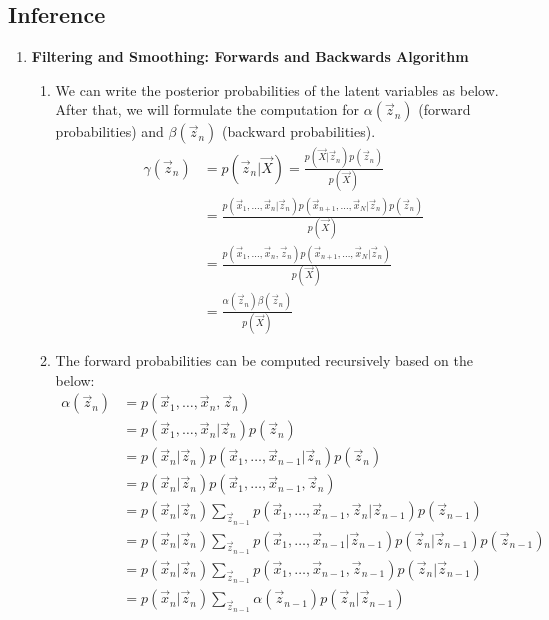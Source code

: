 \documentclass[12pt,twoside]{article}
\begin{document}
\subsection{Inference}
\begin{enumerate}
\item \textbf{Filtering and Smoothing: Forwards and Backwards Algorithm}

	\begin{enumerate}

	\item We can write the posterior probabilities of the latent variables as below. After that, we will formulate the computation for $\alpha(\vec{z}_n)$ (forward probabilities) and $		\beta(\vec{z}_n)$ (backward probabilities).
		\begin{align*}
			\gamma(\vec{z}_n) & = p(\vec{z}_n\vert \vec{X}) = \frac{p(\vec{X}\vert \vec{z}_n)p(\vec{z}_n)}{p(\vec{X})}\\
			& = \frac{p(\vec{x}_1,\ldots, \vec{x}_n \vert \vec{z}_n)p(\vec{x}_{n+1},\ldots,\vec{x}_N\vert \vec{z}_n)p(\vec{z}_n)}{p(\vec{X})}\\
			& = \frac{p(\vec{x}_1,\ldots, \vec{x}_n, \vec{z}_n)p(\vec{x}_{n+1},\ldots,\vec{x}_N\vert \vec{z}_n)}{p(\vec{X})}\\
			& = \frac{\alpha(\vec{z}_n)\beta(\vec{z}_n)}{p(\vec{X})}
		\end{align*}

	\item The forward probabilities can be computed recursively based on the below:
		\begin{align*}
			\alpha(\vec{z}_n)
			& = p(\vec{x}_1,\ldots, \vec{x}_n, \vec{z}_n)\\
			& = p(\vec{x}_1,\ldots, \vec{x}_n\vert \vec{z}_n) p(\vec{z}_n)\\
			& = p(\vec{x}_n\vert \vec{z}_n) p(\vec{x}_1,\ldots, \vec{x}_{n-1}\vert \vec{z}_n) p(\vec{z}_n)\\
			& = p(\vec{x}_n\vert \vec{z}_n) p(\vec{x}_1,\ldots, \vec{x}_{n-1}, \vec{z}_n)\\
			& = p(\vec{x}_n\vert \vec{z}_n) \sum_{\vec{z}_{n-1}}p(\vec{x}_1,\ldots, \vec{x}_{n-1}, \vec{z}_n \vert \vec{z}_{n-1})p(\vec{z}_{n-1})\\
			& = p(\vec{x}_n\vert \vec{z}_n) \sum_{\vec{z}_{n-1}}p(\vec{x}_1,\ldots, \vec{x}_{n-1}\vert \vec{z}_{n-1})p(\vec{z}_n\vert \vec{z}_{n-1}) p(\vec{z}_{n-1})\\
			& = p(\vec{x}_n\vert \vec{z}_n) \sum_{\vec{z}_{n-1}}p(\vec{x}_1,\ldots, \vec{x}_{n-1}, \vec{z}_{n-1})p(\vec{z}_n\vert \vec{z}_{n-1}) \\
			& = p(\vec{x}_n\vert \vec{z}_n) \sum_{\vec{z}_{n-1}} \alpha(\vec{z}_{n-1})p(\vec{z}_n\vert \vec{z}_{n-1})
		\end{align*}


\end{enumerate}
\end{enumerate}
\end{document}
